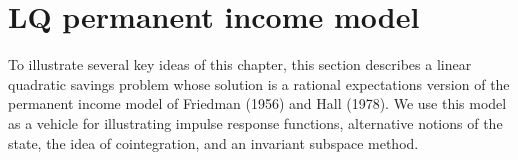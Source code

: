 %
%
 
%
%
%
%
%


\section{LQ permanent income model}\label{sec:LQmodel}%
To illustrate several  key ideas   of this chapter,
 this section describes a linear quadratic savings problem
whose solution is a rational expectations version of the permanent
income model of Friedman  (1956) and Hall (1978). We use this
model as a vehicle for illustrating impulse response functions,
alternative notions of the state, the idea of cointegration,
and an invariant subspace method.
%

